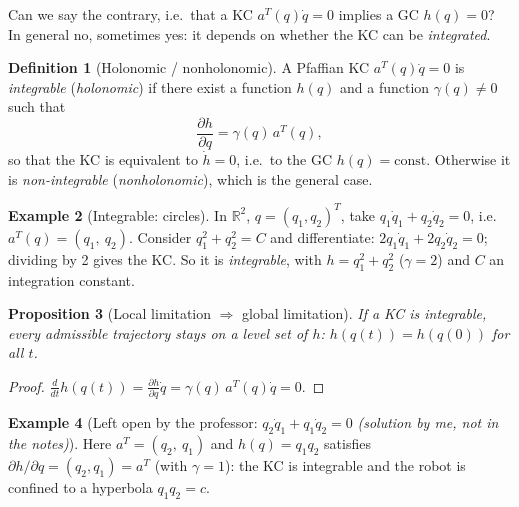\documentclass[11pt,a4paper]{article}
\theoremstyle{definition}
\newtheorem{definition}{Definition}[section]
\newtheorem{example}[definition]{Example}
\theoremstyle{plain}
\newtheorem{proposition}[definition]{Proposition}
\begin{document}
Can we say the contrary, i.e.\ that a KC $a^{T}(q)\dot q=0$ implies a GC $h(q)=0$? In general no, sometimes yes: it depends on whether the KC can be \emph{integrated}.
 
\begin{definition}[Holonomic / nonholonomic]
A Pfaffian KC $a^{T}(q)\dot q=0$ is \emph{integrable} (\emph{holonomic}) if there exist a function $h(q)$ and a function $\gamma(q)\neq0$ such that
\[
\frac{\partial h}{\partial q}=\gamma(q)\,a^{T}(q),
\]
so that the KC is equivalent to $\dot h=0$, i.e.\ to the GC $h(q)=\text{const}$. Otherwise it is \emph{non-integrable} (\emph{nonholonomic}), which is the general case.
\end{definition}
 
\begin{example}[Integrable: circles]\label{ex:circles}
In $\mathbb R^2$, $q=(q_1,q_2)^{T}$, take $q_1\dot q_1+q_2\dot q_2=0$, i.e.\ $a^{T}(q)=(q_1,\ q_2)$. Consider $q_1^2+q_2^2=C$ and differentiate: $2q_1\dot q_1+2q_2\dot q_2=0$; dividing by 2 gives the KC. So it is \emph{integrable}, with $h=q_1^2+q_2^2$ ($\gamma=2$) and $C$ an integration constant.
\end{example}
 
\begin{proposition}[Local limitation $\Rightarrow$ global limitation]\label{prop:l2g}
If a KC is integrable, every admissible trajectory stays on a level set of $h$: $h(q(t))=h(q(0))$ for all $t$.
\end{proposition}
\begin{proof}
$\frac{d}{dt}h(q(t))=\frac{\partial h}{\partial q}\dot q=\gamma(q)\,a^{T}(q)\dot q=0$.
\end{proof}
 
\begin{example}[Left open by the professor: $q_2\dot q_1+q_1\dot q_2=0$ \emph{(solution by me, not in the notes)}]
Here $a^{T}=(q_2,\ q_1)$ and $h(q)=q_1q_2$ satisfies $\partial h/\partial q=(q_2,q_1)=a^{T}$ (with $\gamma=1$): the KC is integrable and the robot is confined to a hyperbola $q_1q_2=c$.
\end{example}
 
\end{document}
